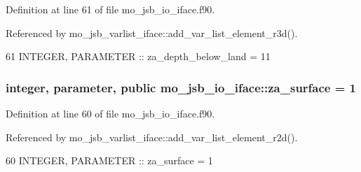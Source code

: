 Definition at line 61 of file mo\+\_\+jsb\+\_\+io\+\_\+iface.\+f90.



Referenced by mo\+\_\+jsb\+\_\+varlist\+\_\+iface\+::add\+\_\+var\+\_\+list\+\_\+element\+\_\+r3d().


\begin{DoxyCode}
61   \textcolor{keywordtype}{INTEGER}, \textcolor{keywordtype}{PARAMETER} :: za\_depth\_below\_land    = 11
\end{DoxyCode}
\hypertarget{namespacemo__jsb__io__iface_ab7d5e02770372d76b4e849aad1df02c6}{}
\subsubsection[{za\+\_\+surface}]{\setlength{\rightskip}{0pt plus 5cm}integer, parameter, public mo\+\_\+jsb\+\_\+io\+\_\+iface\+::za\+\_\+surface = 1}\label{namespacemo__jsb__io__iface_ab7d5e02770372d76b4e849aad1df02c6}


Definition at line 60 of file mo\+\_\+jsb\+\_\+io\+\_\+iface.\+f90.



Referenced by mo\+\_\+jsb\+\_\+varlist\+\_\+iface\+::add\+\_\+var\+\_\+list\+\_\+element\+\_\+r2d().


\begin{DoxyCode}
60   \textcolor{keywordtype}{INTEGER}, \textcolor{keywordtype}{PARAMETER} :: za\_surface             =  1
\end{DoxyCode}
